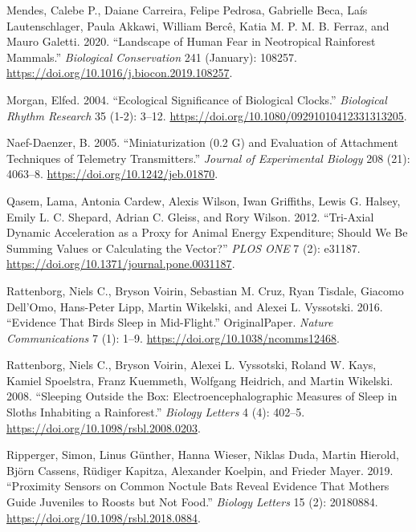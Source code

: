 \documentclass[msc,numbers,hidelinks]{coppe}
\newlength{\cslhangindent}
\newenvironment{cslreferences}%
  {\setlength{\parindent}{0pt}%
  \everypar{\setlength{\hangindent}{\cslhangindent}}\ignorespaces}%
  {\par}
\begin{document}
\begin{cslreferences}
  \leavevmode\hypertarget{ref-mendesLandscapeHumanFear2020}{}%
  Mendes, Calebe P., Daiane Carreira, Felipe Pedrosa, Gabrielle Beca, Laís Lautenschlager, Paula Akkawi, William Bercê, Katia M. P. M. B. Ferraz, and Mauro Galetti. 2020. ``Landscape of Human Fear in Neotropical Rainforest Mammals.'' \emph{Biological Conservation} 241 (January): 108257. \url{https://doi.org/10.1016/j.biocon.2019.108257}.

  \leavevmode\hypertarget{ref-morganEcologicalSignificanceBiological2004}{}%
  Morgan, Elfed. 2004. ``Ecological Significance of Biological Clocks.'' \emph{Biological Rhythm Research} 35 (1-2): 3--12. \url{https://doi.org/10.1080/09291010412331313205}.

  \leavevmode\hypertarget{ref-naef-daenzerMiniaturizationEvaluationAttachment2005}{}%
  Naef-Daenzer, B. 2005. ``Miniaturization (0.2 G) and Evaluation of Attachment Techniques of Telemetry Transmitters.'' \emph{Journal of Experimental Biology} 208 (21): 4063--8. \url{https://doi.org/10.1242/jeb.01870}.

  \leavevmode\hypertarget{ref-qasemTriAxialDynamicAcceleration2012}{}%
  Qasem, Lama, Antonia Cardew, Alexis Wilson, Iwan Griffiths, Lewis G. Halsey, Emily L. C. Shepard, Adrian C. Gleiss, and Rory Wilson. 2012. ``Tri-Axial Dynamic Acceleration as a Proxy for Animal Energy Expenditure; Should We Be Summing Values or Calculating the Vector?'' \emph{PLOS ONE} 7 (2): e31187. \url{https://doi.org/10.1371/journal.pone.0031187}.

  \leavevmode\hypertarget{ref-rattenborgEvidenceThatBirds2016}{}%
  Rattenborg, Niels C., Bryson Voirin, Sebastian M. Cruz, Ryan Tisdale, Giacomo Dell'Omo, Hans-Peter Lipp, Martin Wikelski, and Alexei L. Vyssotski. 2016. ``Evidence That Birds Sleep in Mid-Flight.'' OriginalPaper. \emph{Nature Communications} 7 (1): 1--9. \url{https://doi.org/10.1038/ncomms12468}.

  \leavevmode\hypertarget{ref-rattenborgSleepingOutsideBox2008}{}%
  Rattenborg, Niels C., Bryson Voirin, Alexei L. Vyssotski, Roland W. Kays, Kamiel Spoelstra, Franz Kuemmeth, Wolfgang Heidrich, and Martin Wikelski. 2008. ``Sleeping Outside the Box: Electroencephalographic Measures of Sleep in Sloths Inhabiting a Rainforest.'' \emph{Biology Letters} 4 (4): 402--5. \url{https://doi.org/10.1098/rsbl.2008.0203}.

  \leavevmode\hypertarget{ref-rippergerProximitySensorsCommon2019}{}%
  Ripperger, Simon, Linus Günther, Hanna Wieser, Niklas Duda, Martin Hierold, Björn Cassens, Rüdiger Kapitza, Alexander Koelpin, and Frieder Mayer. 2019. ``Proximity Sensors on Common Noctule Bats Reveal Evidence That Mothers Guide Juveniles to Roosts but Not Food.'' \emph{Biology Letters} 15 (2): 20180884. \url{https://doi.org/10.1098/rsbl.2018.0884}.


\end{cslreferences}
\end{document}
